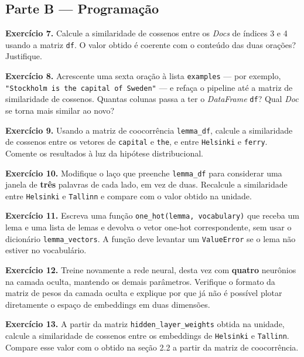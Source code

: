 \documentclass[
  brazilian,
]{article}
\begin{document}
\hypertarget{parte-b-programauxe7uxe3o}{%
\subsection{Parte B --- Programação}\label{parte-b-programauxe7uxe3o}}

\textbf{Exercício 7.} Calcule a similaridade de cossenos entre os
\emph{Docs} de índices 3 e 4 usando a matriz \texttt{df}. O valor obtido
é coerente com o conteúdo das duas orações? Justifique.

\textbf{Exercício 8.} Acrescente uma sexta oração à lista
\texttt{examples} --- por exemplo,
\texttt{"Stockholm\ is\ the\ capital\ of\ Sweden"} --- e refaça o
pipeline até a matriz de similaridade de cossenos. Quantas colunas passa
a ter o \emph{DataFrame} \texttt{df}? Qual \emph{Doc} se torna mais
similar ao novo?

\textbf{Exercício 9.} Usando a matriz de coocorrência
\texttt{lemma\_df}, calcule a similaridade de cossenos entre os vetores
de \texttt{\textquotesingle{}capital\textquotesingle{}} e
\texttt{\textquotesingle{}the\textquotesingle{}}, e entre
\texttt{\textquotesingle{}Helsinki\textquotesingle{}} e
\texttt{\textquotesingle{}ferry\textquotesingle{}}. Comente os
resultados à luz da hipótese distribucional.

\textbf{Exercício 10.} Modifique o laço que preenche \texttt{lemma\_df}
para considerar uma janela de \textbf{três} palavras de cada lado, em
vez de duas. Recalcule a similaridade entre
\texttt{\textquotesingle{}Helsinki\textquotesingle{}} e
\texttt{\textquotesingle{}Tallinn\textquotesingle{}} e compare com o
valor obtido na unidade.

\textbf{Exercício 11.} Escreva uma função
\texttt{one\_hot(lemma,\ vocabulary)} que receba um lema e uma lista de
lemas e devolva o vetor one-hot correspondente, sem usar o dicionário
\texttt{lemma\_vectors}. A função deve levantar um \texttt{ValueError}
se o lema não estiver no vocabulário.

\textbf{Exercício 12.} Treine novamente a rede neural, desta vez com
\textbf{quatro} neurônios na camada oculta, mantendo os demais
parâmetros. Verifique o formato da matriz de pesos da camada oculta e
explique por que já não é possível plotar diretamente o espaço de
embeddings em duas dimensões.

\textbf{Exercício 13.} A partir da matriz
\texttt{hidden\_layer\_weights} obtida na unidade, calcule a
similaridade de cossenos entre os embeddings de
\texttt{\textquotesingle{}Helsinki\textquotesingle{}} e
\texttt{\textquotesingle{}Tallinn\textquotesingle{}}. Compare esse valor
com o obtido na seção 2.2 a partir da matriz de coocorrência.
\end{document}
